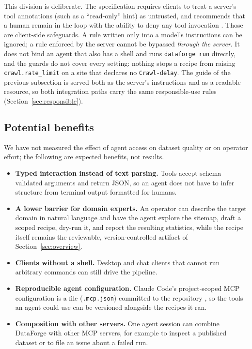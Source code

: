 \documentclass[11pt]{article}
\begin{document}
This division is deliberate. The specification requires clients to treat
a server's tool annotations (such as a ``read-only'' hint) as untrusted,
and recommends that a human remain in the loop with the ability to deny
any tool invocation \cite{mcpspec2026}. Those are client-side safeguards.
A rule written only into a model's instructions can be ignored; a rule
enforced by the server cannot be bypassed \emph{through the server}. It
does not bind an agent that also has a shell and runs \texttt{dataforge
run} directly, and the guards do not cover every setting: nothing stops a
recipe from raising \texttt{crawl.rate\_limit} on a site that declares no
\texttt{Crawl-delay}. The guide of the previous subsection is
served both as the server's instructions and as a readable resource, so
both integration paths carry the same responsible-use rules
(Section~\ref{sec:responsible}).

\subsection{Potential benefits}
We have not measured the effect of agent access on dataset quality or on
operator effort; the following are expected benefits, not results.
\begin{itemize}[leftmargin=1.5em]
  \item \textbf{Typed interaction instead of text parsing.} Tools accept
    schema-validated arguments and return JSON, so an agent does not have
    to infer structure from terminal output formatted for humans.
  \item \textbf{A lower barrier for domain experts.} An operator can
    describe the target domain in natural language and have the agent
    explore the sitemap, draft a scoped recipe, dry-run it, and report
    the resulting statistics, while the recipe itself remains the
    reviewable, version-controlled artifact of Section~\ref{sec:overview}.
  \item \textbf{Clients without a shell.} Desktop and chat clients that
    cannot run arbitrary commands can still drive the pipeline.
  \item \textbf{Reproducible agent configuration.} Claude Code's
    project-scoped MCP configuration is a file (\texttt{.mcp.json})
    committed to the repository \cite{claudecodemcp}, so the tools an
    agent could use can be versioned alongside the recipes it ran.
  \item \textbf{Composition with other servers.} One agent session can
    combine DataForge with other MCP servers, for example to inspect a
    published dataset or to file an issue about a failed run.
\end{itemize}
\end{document}
